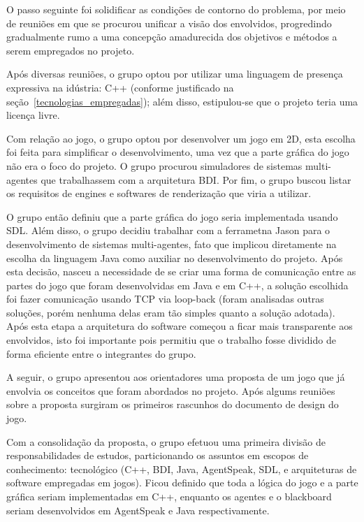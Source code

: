 O passo seguinte foi solidificar as condições de contorno do problema, por meio de reuniões em que se procurou unificar a visão dos envolvidos, progredindo gradualmente rumo a uma concepção amadurecida dos objetivos e métodos a serem empregados no projeto.

Após diversas reuniões, o grupo optou por utilizar uma linguagem de presença expressiva na idústria: C++ (conforme justificado na seção~\ref{tecnologias_empregadas}); além disso, estipulou-se que o projeto teria uma licença livre.

Com relação ao jogo, o grupo optou por desenvolver um jogo em 2D, esta escolha foi feita para simplificar o desenvolvimento, uma vez que a parte gráfica do jogo não era o foco do projeto.
O grupo procurou simuladores de sistemas multi-agentes que trabalhassem com a arquitetura BDI. Por fim, o grupo buscou listar os requisitos de engines e softwares de renderização que viria a utilizar.

O grupo então definiu que a parte gráfica do jogo seria implementada usando SDL. Além disso, o grupo decidiu trabalhar com a ferrametna Jason para o desenvolvimento de sistemas multi-agentes, fato que implicou diretamente na escolha da linguagem Java como auxiliar no desenvolvimento do projeto.
Após esta decisão, nasceu a necessidade de se criar uma forma de comunicação entre as partes do jogo que foram desenvolvidas em Java e em C++, a solução escolhida foi fazer comunicação usando TCP via loop-back (foram analisadas outras soluções, porém nenhuma delas eram tão simples quanto a solução adotada). Após esta etapa a arquitetura do software começou a ficar mais transparente aos envolvidos, isto foi importante pois permitiu que o trabalho fosse dividido de forma eficiente entre o integrantes do grupo.

A seguir, o grupo apresentou aos orientadores uma proposta de um jogo que já envolvia os conceitos que foram abordados no projeto. Após algums reuniões sobre a proposta surgiram os primeiros rascunhos do documento de design do jogo.

Com a consolidação da proposta, o grupo efetuou uma primeira divisão de responsabilidades de estudos, particionando os assuntos em escopos de conhecimento: tecnológico (C++, BDI, Java, AgentSpeak, SDL, e arquiteturas de software empregadas em jogos).
Ficou definido que toda a lógica do jogo e a parte gráfica seriam implementadas em C++, enquanto os agentes e o blackboard seriam desenvolvidos em AgentSpeak e Java respectivamente.
 
